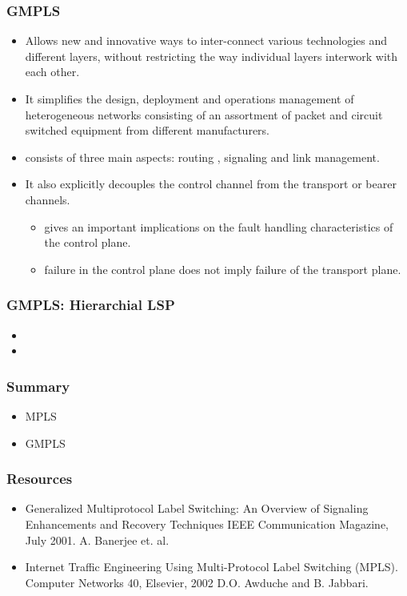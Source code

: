 \documentclass[12pt]{beamer}
\begin{document}
\begin{frame}
	\frametitle{GMPLS}
	\begin{itemize}								
  \item Allows new and innovative ways to inter-connect various technologies and different layers, without restricting the way individual layers interwork with each other. 
  \item It simplifies the design, deployment and operations management of heterogeneous networks consisting of an assortment of packet and circuit switched equipment from different manufacturers.
  \item consists of three main aspects: routing , signaling and link management.
\end{itemize}		
	\begin{itemize}
		\item It also explicitly decouples the control channel from the transport or bearer channels.
		\begin{itemize}
		\item gives an important implications on the fault handling characteristics of the control plane.
		\item failure in the control plane does not imply failure of the transport plane.
		\end{itemize}
	\end{itemize}
\end{frame}

\begin{frame}

\end{frame}


\begin{frame}
  \frametitle{GMPLS: Hierarchial LSP}

  \begin{itemize}
  \item 
  \item 
  \end{itemize}
\end{frame}




\begin{frame}
  \frametitle{Summary}
  \begin{itemize}
  \item MPLS
  \item GMPLS
  \end{itemize}
\end{frame}

\begin{frame}
  \frametitle{Resources}
  \begin{itemize}
  \item Generalized Multiprotocol Label Switching: An Overview of Signaling Enhancements and Recovery Techniques
IEEE Communication Magazine, July 2001.
A. Banerjee et. al. 
  \item Internet Traffic Engineering Using Multi-Protocol Label Switching (MPLS).
Computer Networks 40, Elsevier, 2002
D.O. Awduche and B. Jabbari. 
  \end{itemize}
\end{frame}
\end{document}
